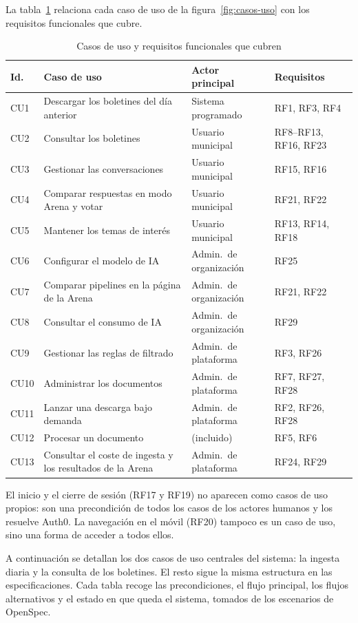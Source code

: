 La tabla~\ref{tab:casos-uso} relaciona cada caso de uso de la figura~\ref{fig:casos-uso} con los requisitos funcionales que cubre.

\begin{table}[htbp]
\centering\small
\caption{Casos de uso y requisitos funcionales que cubren}
\label{tab:casos-uso}
\begin{tabularx}{\textwidth}{@{}l X l l@{}}
\toprule
\textbf{Id.} & \textbf{Caso de uso} & \textbf{Actor principal} & \textbf{Requisitos} \\
\midrule
CU1  & Descargar los boletines del día anterior & Sistema programado & RF1, RF3, RF4 \\
CU2  & Consultar los boletines & Usuario municipal & RF8--RF13, RF16, RF23 \\
CU3  & Gestionar las conversaciones & Usuario municipal & RF15, RF16 \\
CU4  & Comparar respuestas en modo Arena y votar & Usuario municipal & RF21, RF22 \\
CU5  & Mantener los temas de interés & Usuario municipal & RF13, RF14, RF18 \\
CU6  & Configurar el modelo de IA & Admin.\ de organización & RF25 \\
CU7  & Comparar pipelines en la página de la Arena & Admin.\ de organización & RF21, RF22 \\
CU8  & Consultar el consumo de IA & Admin.\ de organización & RF29 \\
CU9  & Gestionar las reglas de filtrado & Admin.\ de plataforma & RF3, RF26 \\
CU10 & Administrar los documentos & Admin.\ de plataforma & RF7, RF27, RF28 \\
CU11 & Lanzar una descarga bajo demanda & Admin.\ de plataforma & RF2, RF26, RF28 \\
CU12 & Procesar un documento & (incluido) & RF5, RF6 \\
CU13 & Consultar el coste de ingesta y los resultados de la Arena & Admin.\ de plataforma & RF24, RF29 \\
\bottomrule
\end{tabularx}
\end{table}

El inicio y el cierre de sesión (RF17 y RF19) no aparecen como casos de uso propios: son una precondición de todos los casos de los actores humanos y los resuelve Auth0. La navegación en el móvil (RF20) tampoco es un caso de uso, sino una forma de acceder a todos ellos.

A continuación se detallan los dos casos de uso centrales del sistema: la ingesta diaria y la consulta de los boletines. El resto sigue la misma estructura en las especificaciones. Cada tabla recoge las precondiciones, el flujo principal, los flujos alternativos y el estado en que queda el sistema, tomados de los escenarios de OpenSpec.

